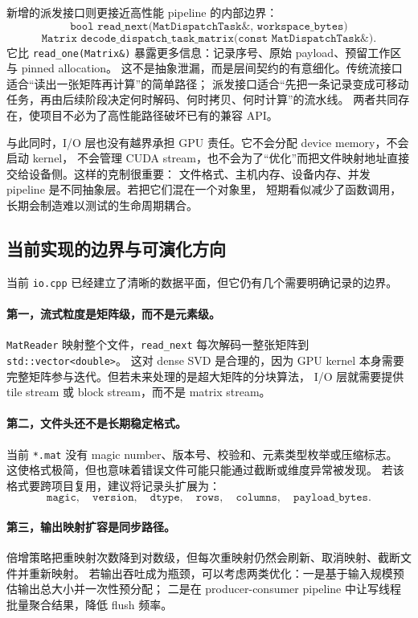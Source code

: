 新增的派发接口则更接近高性能 pipeline 的内部边界：
\[
    \texttt{bool read\_next(MatDispatchTask\&, workspace\_bytes)}
\]
\[
    \texttt{Matrix decode\_dispatch\_task\_matrix(const MatDispatchTask\&)}.
\]
它比 \texttt{read\_one(Matrix\&)} 暴露更多信息：记录序号、原始 payload、预留工作区与 pinned allocation。
这不是抽象泄漏，而是层间契约的有意细化。传统流接口适合“读出一张矩阵再计算”的简单路径；
派发接口适合“先把一条记录变成可移动任务，再由后续阶段决定何时解码、何时拷贝、何时计算”的流水线。
两者共同存在，使项目不必为了高性能路径破坏已有的兼容 API。

与此同时，I/O 层也没有越界承担 GPU 责任。它不会分配 device memory，不会启动 kernel，
不会管理 CUDA stream，也不会为了“优化”而把文件映射地址直接交给设备侧。这样的克制很重要：
文件格式、主机内存、设备内存、并发 pipeline 是不同抽象层。若把它们混在一个对象里，
短期看似减少了函数调用，长期会制造难以测试的生命周期耦合。

\subsection{当前实现的边界与可演化方向}

当前 \texttt{io.cpp} 已经建立了清晰的数据平面，但它仍有几个需要明确记录的边界。

\paragraph{第一，流式粒度是矩阵级，而不是元素级。}
\texttt{MatReader} 映射整个文件，\texttt{read\_next} 每次解码一整张矩阵到 \texttt{std::vector<double>}。
这对 dense SVD 是合理的，因为 GPU kernel 本身需要完整矩阵参与迭代。但若未来处理的是超大矩阵的分块算法，
I/O 层就需要提供 tile stream 或 block stream，而不是 matrix stream。

\paragraph{第二，文件头还不是长期稳定格式。}
当前 \texttt{*.mat} 没有 magic number、版本号、校验和、元素类型枚举或压缩标志。
这使格式极简，但也意味着错误文件可能只能通过截断或维度异常被发现。
若该格式要跨项目复用，建议将记录头扩展为：
\[
    \texttt{magic},\quad \texttt{version},\quad \texttt{dtype},\quad
    \texttt{rows},\quad \texttt{columns},\quad \texttt{payload\_bytes}.
\]

\paragraph{第三，输出映射扩容是同步路径。}
倍增策略把重映射次数降到对数级，但每次重映射仍然会刷新、取消映射、截断文件并重新映射。
若输出吞吐成为瓶颈，可以考虑两类优化：一是基于输入规模预估输出总大小并一次性预分配；
二是在 producer-consumer pipeline 中让写线程批量聚合结果，降低 flush 频率。

